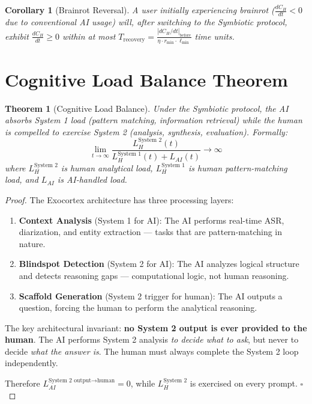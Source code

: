 \documentclass[12pt,a4paper]{article}
\newtheorem{theorem}{Theorem}[section]
\newtheorem{corollary}{Corollary}[section]
\theoremstyle{remark}
\begin{document}
\begin{corollary}[Brainrot Reversal]
A user initially experiencing brainrot ($\frac{dC_H}{dt} < 0$ due to conventional AI usage) will, after switching to the Symbiotic protocol, exhibit $\frac{dC_H}{dt} \geq 0$ within at most $T_{\text{recovery}} = \frac{|dC_H/dt|_{\text{before}}}{\eta \cdot r_{\min} \cdot \ell_{\min}}$ time units.
\end{corollary}

\section{Cognitive Load Balance Theorem}

\begin{theorem}[Cognitive Load Balance]
Under the Symbiotic protocol, the AI absorbs System 1 load (pattern matching, information retrieval) while the human is compelled to exercise System 2 (analysis, synthesis, evaluation). Formally:
\begin{equation}
\lim_{t \to \infty} \frac{L_H^{\text{System 2}}(t)}{L_H^{\text{System 1}}(t) + L_{AI}(t)} \to \infty
\label{eq:balance}
\end{equation}
where $L_H^{\text{System 2}}$ is human analytical load, $L_H^{\text{System 1}}$ is human pattern-matching load, and $L_{AI}$ is AI-handled load.
\end{theorem}

\begin{proof}
The Exocortex architecture has three processing layers:
\begin{enumerate}
    \item \textbf{Context Analysis} (System 1 for AI): The AI performs real-time ASR, diarization, and entity extraction — tasks that are pattern-matching in nature.
    \item \textbf{Blindspot Detection} (System 2 for AI): The AI analyzes logical structure and detects reasoning gaps — computational logic, not human reasoning.
    \item \textbf{Scaffold Generation} (System 2 trigger for human): The AI outputs a question, forcing the human to perform the analytical reasoning.
\end{enumerate}

The key architectural invariant: \textbf{no System 2 output is ever provided to the human}. The AI performs System 2 analysis \emph{to decide what to ask}, but never to decide \emph{what the answer is}. The human must always complete the System 2 loop independently.

Therefore $L_{AI}^{\text{System 2 output} \to \text{human}} = 0$, while $L_H^{\text{System 2}}$ is exercised on every prompt. $\square$
\end{proof}
\end{document}
